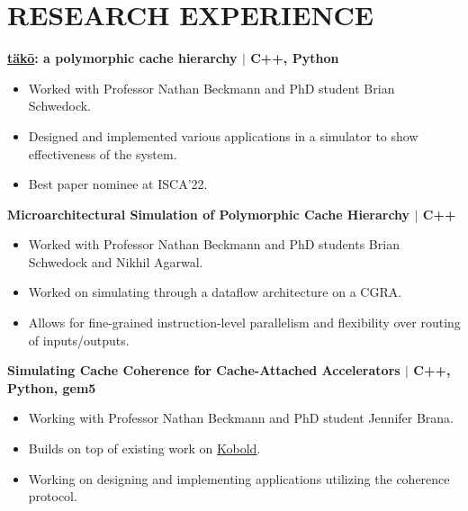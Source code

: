 \documentclass[10pt]{article}
\begin{document}
  \section*{\large \textcolor{lighterB}{RESEARCH EXPERIENCE}}
  \vspace*{-0.23cm}

\textbf{\large \href{https://dl.acm.org/doi/10.1145/3470496.3527379}{\underline{täkō}}: a polymorphic cache hierarchy $\mid$ C++, Python} 
  \vspace*{-0.17cm}
  \begin{itemize}
    \itemsep0em
    \item \textcolor{lighterG}{Worked with Professor Nathan Beckmann and PhD student Brian Schwedock.}
    \item \textcolor{lighterG}{Designed and implemented various applications in a simulator to show effectiveness of the system.}
    \item \textcolor{lighterG}{Best paper nominee at ISCA'22.}
  \end{itemize}

  \textbf{\large {Microarchitectural Simulation of Polymorphic Cache Hierarchy} $\mid$ C++} 
  \vspace*{-0.17cm}
  \begin{itemize}
    \itemsep0em
    \item \textcolor{lighterG}{Worked with Professor Nathan Beckmann and PhD students Brian Schwedock and Nikhil Agarwal.}
    \item \textcolor{lighterG}{Worked on simulating through a dataflow architecture on a CGRA.}
    \item \textcolor{lighterG}{Allows for fine-grained instruction-level parallelism and flexibility over routing of inputs/outputs.}
  \end{itemize}

  \textbf{\large {Simulating Cache Coherence for Cache-Attached Accelerators} $\mid$ C++, Python, gem5} 
  \vspace*{-0.17cm}
  \begin{itemize}
    \itemsep0em
    \item \textcolor{lighterG}{Working with Professor Nathan Beckmann and PhD student Jennifer Brana.}
    \item \textcolor{lighterG}{Builds on top of existing work on \href{https://ieeexplore.ieee.org/document/10106564}{\underline{Kobold}}.}
    \item \textcolor{lighterG}{Working on designing and implementing applications utilizing the coherence protocol.}
  \end{itemize}
\end{document}
